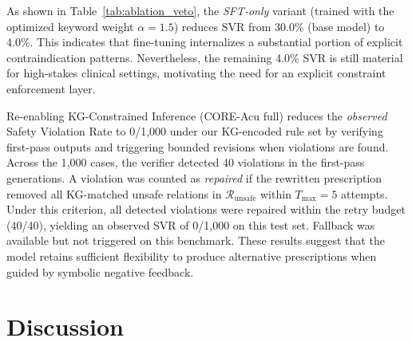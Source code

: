 \documentclass[preprint,5p,times,twocolumn,fleqn]{elsarticle}
\begin{document}
As shown in Table~\ref{tab:ablation_veto}, the \textit{SFT-only} variant (trained with the optimized keyword weight $\alpha=1.5$) reduces SVR from 30.0\% (base model) to 4.0\%. This indicates that fine-tuning internalizes a substantial portion of explicit contraindication patterns. Nevertheless, the remaining 4.0\% SVR is still material for high-stakes clinical settings, motivating the need for an explicit constraint enforcement layer.

Re-enabling KG-Constrained Inference (CORE-Acu full) reduces the \emph{observed} Safety Violation Rate to 0/1{,}000 under our KG-encoded rule set by verifying first-pass outputs and triggering bounded revisions when violations are found. Across the 1{,}000 cases, the verifier detected 40 violations in the first-pass generations.
A violation was counted as \emph{repaired} if the rewritten prescription removed all KG-matched unsafe relations in $\mathcal{R}_{\text{unsafe}}$ within $T_{\max}=5$ attempts. 
Under this criterion, all detected violations were repaired within the retry budget (40/40), yielding an observed SVR of 0/1{,}000 on this test set. Fallback was available but not triggered on this benchmark.
These results suggest that the model retains sufficient flexibility to produce alternative prescriptions when guided by symbolic negative feedback.





\section{Discussion}
\label{sec:discussion}
\end{document}
